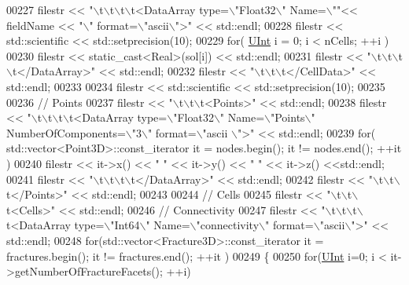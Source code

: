 \begin{DoxyCode}
00227     filestr << \textcolor{stringliteral}{"\(\backslash\)t\(\backslash\)t\(\backslash\)t\(\backslash\)t<DataArray type=\(\backslash\)"Float32\(\backslash\)" Name=\(\backslash\)""}<< fieldName << \textcolor{stringliteral}{"\(\backslash\)" format=\(\backslash\)"ascii\(\backslash\)">"} << 
      std::endl;
00228     filestr << std::scientific << std::setprecision(10);
00229     \textcolor{keywordflow}{for}( \hyperlink{namespaceFVCode3D_a4bf7e328c75d0fd504050d040ebe9eda}{UInt} i = 0; i < nCells; ++i )
00230         filestr << static\_cast<Real>(sol[i]) << std::endl;
00231     filestr << \textcolor{stringliteral}{"\(\backslash\)t\(\backslash\)t\(\backslash\)t\(\backslash\)t</DataArray>"} << std::endl;
00232     filestr << \textcolor{stringliteral}{"\(\backslash\)t\(\backslash\)t\(\backslash\)t</CellData>"} << std::endl;
00233 
00234     filestr << std::scientific << std::setprecision(10);
00235 
00236     \textcolor{comment}{// Points}
00237     filestr << \textcolor{stringliteral}{"\(\backslash\)t\(\backslash\)t\(\backslash\)t<Points>"} << std::endl;
00238     filestr << \textcolor{stringliteral}{"\(\backslash\)t\(\backslash\)t\(\backslash\)t\(\backslash\)t<DataArray type=\(\backslash\)"Float32\(\backslash\)" Name=\(\backslash\)"Points\(\backslash\)" NumberOfComponents=\(\backslash\)"3\(\backslash\)" format=\(\backslash\)"ascii
      \(\backslash\)">"} << std::endl;
00239     \textcolor{keywordflow}{for}( std::vector<Point3D>::const\_iterator it = nodes.begin(); it != nodes.end(); ++it )
00240         filestr << it->x() << \textcolor{stringliteral}{" "} << it->y() << \textcolor{stringliteral}{" "} << it->z() <<std::endl;
00241     filestr << \textcolor{stringliteral}{"\(\backslash\)t\(\backslash\)t\(\backslash\)t\(\backslash\)t</DataArray>"} << std::endl;
00242     filestr << \textcolor{stringliteral}{"\(\backslash\)t\(\backslash\)t\(\backslash\)t</Points>"} << std::endl;
00243 
00244     \textcolor{comment}{// Cells}
00245     filestr << \textcolor{stringliteral}{"\(\backslash\)t\(\backslash\)t\(\backslash\)t<Cells>"} << std::endl;
00246     \textcolor{comment}{//  Connectivity}
00247     filestr << \textcolor{stringliteral}{"\(\backslash\)t\(\backslash\)t\(\backslash\)t\(\backslash\)t<DataArray type=\(\backslash\)"Int64\(\backslash\)" Name=\(\backslash\)"connectivity\(\backslash\)" format=\(\backslash\)"ascii\(\backslash\)">"} << std::endl;
00248     \textcolor{keywordflow}{for}(std::vector<Fracture3D>::const\_iterator it = fractures.begin(); it != fractures.end(); ++it )
00249     \{
00250         \textcolor{keywordflow}{for}(\hyperlink{namespaceFVCode3D_a4bf7e328c75d0fd504050d040ebe9eda}{UInt} i=0; i < it->getNumberOfFractureFacets(); ++i)

\end{DoxyCode}
